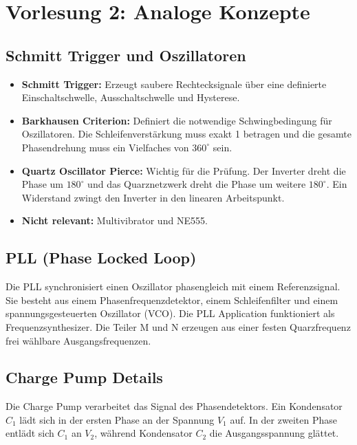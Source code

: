 \documentclass[11pt,a4paper]{article}
\begin{document}
\newpage

\section{Vorlesung 2: Analoge Konzepte}

\subsection{Schmitt Trigger und Oszillatoren}
\begin{itemize}
    \item \textbf{Schmitt Trigger:} Erzeugt saubere Rechtecksignale über eine definierte Einschaltschwelle, Ausschaltschwelle und Hysterese.
    \item \textbf{Barkhausen Criterion:} Definiert die notwendige Schwingbedingung für Oszillatoren. Die Schleifenverstärkung muss exakt 1 betragen und die gesamte Phasendrehung muss ein Vielfaches von $360^\circ$ sein.
    \item \textbf{Quartz Oscillator Pierce:} Wichtig für die Prüfung. Der Inverter dreht die Phase um $180^\circ$ und das Quarznetzwerk dreht die Phase um weitere $180^\circ$. Ein Widerstand zwingt den Inverter in den linearen Arbeitspunkt.
    \item \textbf{Nicht relevant:} Multivibrator und NE555.
\end{itemize}

\subsection{PLL (Phase Locked Loop)}
Die PLL synchronisiert einen Oszillator phasengleich mit einem Referenzsignal. Sie besteht aus einem Phasenfrequenzdetektor, einem Schleifenfilter und einem spannungsgesteuerten Oszillator (VCO). Die PLL Application funktioniert als Frequenzsynthesizer. Die Teiler M und N erzeugen aus einer festen Quarzfrequenz frei wählbare Ausgangsfrequenzen.

\subsection{Charge Pump Details}
Die Charge Pump verarbeitet das Signal des Phasendetektors. Ein Kondensator $C_1$ lädt sich in der ersten Phase an der Spannung $V_1$ auf. In der zweiten Phase entlädt sich $C_1$ an $V_2$, während Kondensator $C_2$ die Ausgangsspannung glättet.
\end{document}
